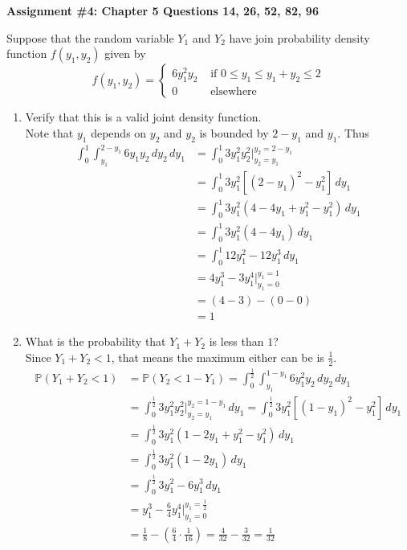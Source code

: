 \documentclass[12pt]{article}
\newcommand{\ques}[1]{\noindent {\bf Question #1: }}
\newcommand{\prob}[1]{\mathbb{P}(#1)}
\begin{document}
\begin{center} \textbf{Assignment \#4: Chapter 5 Questions 14, 26, 52, 82, 96} \end{center}

\ques{5.14} Suppose that the random variable $Y_1$ and $Y_2$ have join probability density function $f(y_1, y_2)$ given by 
$$ f(y_1, y_2) = \begin{cases} 6y_1^2y_2 &\text{ if } 0 \leq y_1 \leq y_1 + y_2 \leq 2 \\ 0 &\text{ elsewhere} \end{cases} $$ 
\begin{enumerate}
\item Verify that this is a valid joint density function. \\
Note that $y_1$ depends on $y_2$ and $y_2$ is bounded by $2-y_1$ and $y_1$. Thus
$$ \begin{aligned} 
\int_0^1 \int_{y_1}^{2-y_1} 6y_1y_2 \, dy_2 \, dy_1 &= \int_0^1 3y_1^2 y_2^2\Big|_{y_2 = y_1}^{y_2 = 2-y_1} \\ &= \int_0^1 3y_1^2[(2-y_1)^2 - y_1^2] \, dy_1 \\ &= \int_0^1 3y_1^2(4 - 4y_1 + y_1^2 - y_1^2) \, dy_1 \\ &= \int_0^1 3y_1^2(4 - 4y_1)\, dy_1 \\ &= \int_0^1 12y_1^2 - 12y_1^3 \, dy_1 \\ &= 4y_1^3 - 3y_1^4\Big|_{y_1 = 0}^{y_1 = 1} \\ &= (4 - 3) - (0 - 0) \\ &= 1
\end{aligned} $$ 
\item What is the probability that $Y_1 + Y_2$ is less than $1$? \\
Since $Y_1 + Y_2 < 1$, that means the maximum either can be is $\frac{1}{2}$. 
$$ \begin{aligned}
\prob{Y_1 + Y_2 < 1} &= \prob{Y_2 < 1 - Y_1}  = \int_0^{\frac{1}{2}} \int_{y_1}^{1 - y_1} 6y_1^2y_2 \, dy_2 \, dy_1 \\ &= \int_0^{\frac{1}{2}} 3y_1^2y_2^2\Big|_{y_2 = y_1}^{y_2 = 1 - y_1} \, dy_1 = \int_0^{\frac{1}{2}} 3y_1^2[(1-y_1)^2 - y_1^2] \, dy_1 \\ &= \int_0^{\frac{1}{2}} 3y_1^2(1 - 2y_1 + y_1^2 - y_1^2) \, dy_1 \\ &= \int_0^{\frac{1}{2}} 3y_1^2(1 - 2y_1) \, dy_1 \\ &= \int_0^{\frac{1}{2}} 3y_1^2 - 6y_1^3 \, dy_1 \\ &= y_1^3 - \frac{6}{4}y_1^4\Big|_{y_1 = 0}^{y_1 = \frac{1}{2}} \\ &= \frac{1}{8} - \left(\frac{6}{4} \cdot \frac{1}{16} \right) = \frac{4}{32} - \frac{3}{32} = \frac{1}{32}
\end{aligned} $$ 
\end{enumerate} 
\end{document}
